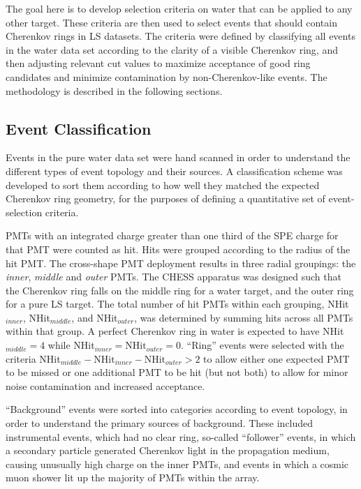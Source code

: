 The goal here is to develop selection criteria on water that can be applied to any other target.
These criteria are then used to select events that should contain Cherenkov rings in LS datasets.
The criteria were defined by classifying all events in the water data set according to the clarity of a visible Cherenkov ring, and then adjusting relevant cut values to maximize acceptance of good ring candidates and minimize contamination by non-Cherenkov-like events.
The methodology is described in the following sections.

\subsection{Event Classification}\label{s:class}
Events in the pure water data set were hand scanned in order to understand the different types of event topology and their sources.
A classification scheme was developed to sort them according to how well they matched the expected Cherenkov ring geometry, for the purposes of defining a quantitative set of event-selection criteria. 

PMTs with an integrated charge greater than one third of the SPE charge for that PMT were counted as hit.  
Hits were grouped according to the radius of the hit PMT.  
The cross-shape PMT deployment results in three radial groupings: the \textit{ inner}, \textit{ middle} and \textit{ outer} PMTs.  
The CHESS apparatus was designed such that the Cherenkov ring falls on the middle ring for a water target, and the outer ring for a pure LS target.  
The total number of hit PMTs within each grouping, 
NHit$_{inner}$, NHit$_{middle}$, and NHit$_{outer}$, was determined by summing hits across all PMTs within that group. 
A perfect Cherenkov ring in water is expected to have NHit$_{middle} = 4$ while NHit$_{inner} = \mathrm{ NHit}_{outer} = 0$. 
``Ring'' events were selected with the criteria NHit$_{middle} - \mathrm{ NHit}_{inner} - \mathrm{ NHit}_{outer} > 2$ to allow either one expected PMT to be missed or one additional PMT to be hit (but not both) to allow for minor noise contamination and increased acceptance.

``Background'' events were sorted into categories according to  event topology, in order to understand the primary sources of background.  
These included instrumental events, which had no clear ring, so-called ``follower'' events, in which a secondary particle generated Cherenkov light in the propagation medium, causing unusually high charge on the inner PMTs, and events in which a cosmic muon shower lit up the majority of PMTs within the array.

